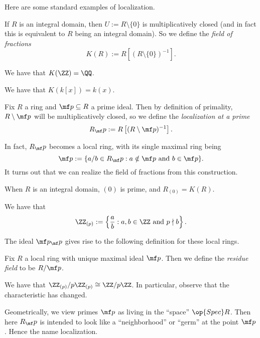 Here are some standard examples of localization.
\begin{definition}
	If $R$ is an integral domain, then $U:=R\setminus\{0\}$ is multiplicatively closed (and in fact this is equivalent to $R$ being an integral domain). So we define the \textit{field of fractions}
	\[K(R):=R\left[(R\setminus\{0\})^{-1}\right].\]
\end{definition}
\begin{example}
	We have that $K(\ZZ)=\QQ$.
\end{example}
\begin{example}
	We have that $K(k[x])=k(x)$.
\end{example}
\begin{definition}
	Fix $R$ a ring and $\mf p\subseteq R$ a prime ideal. Then by definition of primality, $R\setminus\mf p$ will be multiplicatively closed, so we define the \textit{localization at a prime}
	\[R_\mf p:=R\left[(R\setminus\mf p)^{-1}\right].\]
\end{definition}
In fact, $R_\mf p$ becomes a local ring, with its single maximal ring being
\[\mf p:=\{a/b\in R_\mf p:a\notin\mf p\text{ and }b\in\mf p\}.\]
It turns out that we can realize the field of fractions from this construction.
\begin{example}
	When $R$ is an integral domain, $(0)$ is prime, and $R_{(0)}=K(R)$.
\end{example}
\begin{example}
	We have that
	\[\ZZ_{(p)}:=\left\{\frac ab:a,b\in\ZZ\text{ and }p\nmid b\right\}.\]
\end{example}
The ideal $\mf p_\mf p$ gives rise to the following definition for these local rings.
\begin{definition}
	Fix $R$ a local ring with unique maximal ideal $\mf p$. Then we define the \textit{residue field} to be $R/\mf p$.
\end{definition}
\begin{example}
	We have that $\ZZ_{(p)}/p\ZZ_{(p)}\cong\ZZ/p\ZZ$. In particular, observe that the characteristic has changed.
\end{example}
Geometrically, we view primes $\mf p$ as living in the ``space'' $\op{Spec}R$. Then here $R_\mf p$ is intended to look like a ``neighborhood'' or ``germ'' at the point $\mf p$. Hence the name localization.

